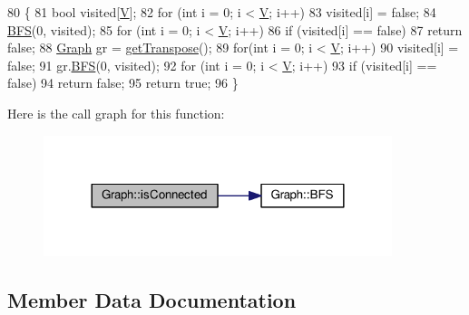\begin{DoxyCode}
80 \{
81     \textcolor{keywordtype}{bool} visited[\hyperlink{classGraph_a2b722f7cfa7a21e4cb5fae488b3d4dcc}{V}];
82     \textcolor{keywordflow}{for} (\textcolor{keywordtype}{int} i = 0; i < \hyperlink{classGraph_a2b722f7cfa7a21e4cb5fae488b3d4dcc}{V}; i++)
83         visited[i] = \textcolor{keyword}{false};
84     \hyperlink{classGraph_ace37a14bfa5c1c748fd233629f6c1ca3}{BFS}(0, visited);
85     \textcolor{keywordflow}{for} (\textcolor{keywordtype}{int} i = 0; i < \hyperlink{classGraph_a2b722f7cfa7a21e4cb5fae488b3d4dcc}{V}; i++)
86         \textcolor{keywordflow}{if} (visited[i] == \textcolor{keyword}{false})
87             \textcolor{keywordflow}{return} \textcolor{keyword}{false};
88     \hyperlink{classGraph}{Graph} gr = \hyperlink{classGraph_abdaf0cb08811d4b30f4c85f632e0e181}{getTranspose}();
89     \textcolor{keywordflow}{for}(\textcolor{keywordtype}{int} i = 0; i < \hyperlink{classGraph_a2b722f7cfa7a21e4cb5fae488b3d4dcc}{V}; i++)
90         visited[i] = \textcolor{keyword}{false};
91     gr.\hyperlink{classGraph_ace37a14bfa5c1c748fd233629f6c1ca3}{BFS}(0, visited);
92     \textcolor{keywordflow}{for} (\textcolor{keywordtype}{int} i = 0; i < \hyperlink{classGraph_a2b722f7cfa7a21e4cb5fae488b3d4dcc}{V}; i++)
93         \textcolor{keywordflow}{if} (visited[i] == \textcolor{keyword}{false})
94             \textcolor{keywordflow}{return} \textcolor{keyword}{false};
95     \textcolor{keywordflow}{return} \textcolor{keyword}{true};
96 \}
\end{DoxyCode}


Here is the call graph for this function\+:
\nopagebreak
\begin{figure}[H]
\begin{center}
\leavevmode
\includegraphics[width=288pt]{classGraph_add6f4a13a70d1b15f370db0bd4669b90_cgraph}
\end{center}
\end{figure}




\subsection{Member Data Documentation}
